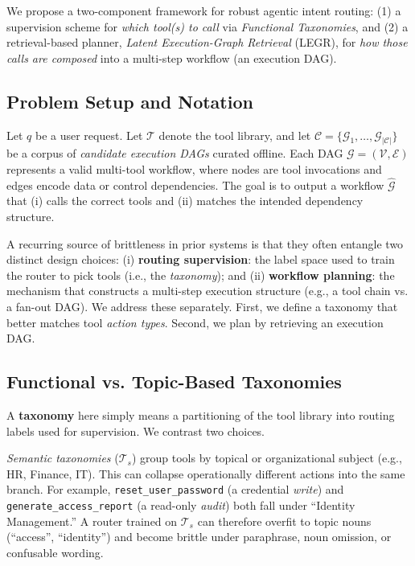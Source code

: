 \documentclass{article}
\begin{document}
We propose a two-component framework for robust agentic intent routing: (1) a supervision scheme for \emph{which tool(s) to call} via \emph{Functional Taxonomies}, and (2) a retrieval-based planner, \textit{Latent Execution-Graph Retrieval} (LEGR), for \emph{how those calls are composed} into a multi-step workflow (an execution DAG).

\subsection{Problem Setup and Notation}
Let $q$ be a user request. Let $\mathcal{T}$ denote the tool library, and let $\mathcal{C} = \{\mathcal{G}_1,\dots,\mathcal{G}_{|\mathcal{C}|}\}$ be a corpus of \emph{candidate execution DAGs} curated offline. Each DAG $\mathcal{G}=(\mathcal{V},\mathcal{E})$ represents a valid multi-tool workflow, where nodes are tool invocations and edges encode data or control dependencies. The goal is to output a workflow $\hat{\mathcal{G}}$ that (i) calls the correct tools and (ii) matches the intended dependency structure.

A recurring source of brittleness in prior systems is that they often entangle two distinct design choices:
(i) \textbf{routing supervision}: the label space used to train the router to pick tools (i.e., the \emph{taxonomy}); and
(ii) \textbf{workflow planning}: the mechanism that constructs a multi-step execution structure (e.g., a tool chain vs. a fan-out DAG).
We address these separately. First, we define a taxonomy that better matches tool \emph{action types}. Second, we plan by retrieving an execution DAG.

\subsection{Functional vs. Topic-Based Taxonomies}
A \textbf{taxonomy} here simply means a partitioning of the tool library into routing labels used for supervision. We contrast two choices.

\textit{Semantic taxonomies} ($\mathcal{T}_s$) group tools by topical or organizational subject (e.g., HR, Finance, IT). This can collapse operationally different actions into the same branch. For example, \texttt{reset\_user\_password} (a credential \emph{write}) and \texttt{generate\_access\_report} (a read-only \emph{audit}) both fall under ``Identity Management.'' A router trained on $\mathcal{T}_s$ can therefore overfit to topic nouns (``access'', ``identity'') and become brittle under paraphrase, noun omission, or confusable wording.
\end{document}
